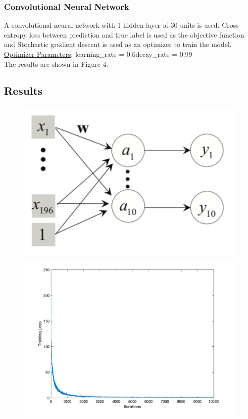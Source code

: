 \documentclass[letter, 10pt]{article}
\begin{document}
\subsubsection*{Convolutional Neural Network}
A convolutional neural network with 1 hidden layer of 30 units is used. Cross entropy loss between prediction and true label is used as the objective function and Stochastic gradient descent is used as an optimizer to train the model.\\
\underline{Optimizer Parameters}: learning\_rate = 0.6\quad decay\_rate = 0.99\\
The results are shown in Figure 4.

\subsection*{Results}
\begin{figure}[H]
        \centering
        \includegraphics[width=\textwidth]{HW4/RESULT/SLP_linear.png}
    \endminipage\hfill
        \centering
        \includegraphics[width=1.1\textwidth]{HW4/RESULT/SLP_linear_loss.png}

\end{figure}
\end{document}

